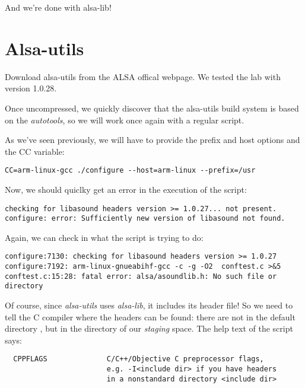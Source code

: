 And we're done with alsa-lib!

\section{Alsa-utils}

Download alsa-utils from the ALSA offical webpage. We tested the lab
with version 1.0.28.

Once uncompressed, we quickly discover that the alsa-utils build
system is based on the {\em autotools}, so we will work once again
with a regular  script.

As we've seen previously, we will have to provide the prefix and host
options and the CC variable:

\begin{verbatim}
CC=arm-linux-gcc ./configure --host=arm-linux --prefix=/usr
\end{verbatim}

Now, we should quiclky get an error in the execution of the
 script:

\begin{verbatim}
checking for libasound headers version >= 1.0.27... not present.
configure: error: Sufficiently new version of libasound not found.
\end{verbatim}

Again, we can check in  what the 
script is trying to do:

\footnotesize
\begin{verbatim}
configure:7130: checking for libasound headers version >= 1.0.27
configure:7192: arm-linux-gnueabihf-gcc -c -g -O2  conftest.c >&5
conftest.c:15:28: fatal error: alsa/asoundlib.h: No such file or directory
\end{verbatim}
\normalsize

Of course, since {\em alsa-utils} uses {\em alsa-lib}, it includes
its header file! So we need to tell the C compiler where the headers
can be found: there are not in the default directory
, but in the  directory of our
{\em staging} space. The help text of the  script says:

\begin{verbatim}
  CPPFLAGS              C/C++/Objective C preprocessor flags,
                        e.g. -I<include dir> if you have headers
                        in a nonstandard directory <include dir>
\end{verbatim}

